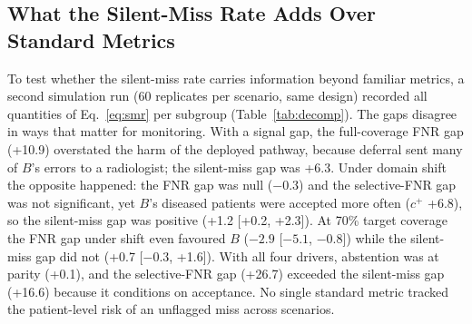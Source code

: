 \subsection{What the Silent-Miss Rate Adds Over Standard Metrics}
\label{sec:decomp}
To test whether the silent-miss rate carries information beyond familiar metrics, a second simulation run (60 replicates per scenario, same design) recorded all quantities of Eq.~\eqref{eq:smr} per subgroup (Table~\ref{tab:decomp}). The gaps disagree in ways that matter for monitoring. With a signal gap, the full-coverage FNR gap (+10.9\pp) overstated the harm of the deployed pathway, because deferral sent many of $B$'s errors to a radiologist; the silent-miss gap was +6.3\pp. Under domain shift the opposite happened: the FNR gap was null ($-0.3$\pp) and the selective-FNR gap was not significant, yet $B$'s diseased patients were accepted more often ($c^{+}$ +6.8\pp), so the silent-miss gap was positive (+1.2\pp{} [+0.2, +2.3]). At 70\% target coverage the FNR gap under shift even favoured $B$ ($-2.9$\pp{} [$-5.1$, $-0.8$]) while the silent-miss gap did not (+0.7\pp{} [$-0.3$, +1.6]). With all four drivers, abstention was at parity (+0.1\pp), and the selective-FNR gap (+26.7\pp) exceeded the silent-miss gap (+16.6\pp) because it conditions on acceptance. No single standard metric tracked the patient-level risk of an unflagged miss across scenarios.

